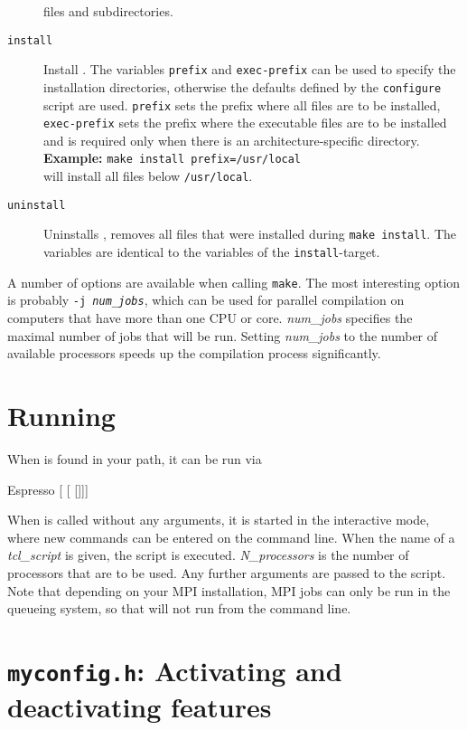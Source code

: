 \begin{description}
  files and subdirectories.
\item[\texttt{install}] Install \es. The variables \texttt{prefix} and
  \texttt{exec-prefix} can be used to specify the installation
  directories, otherwise the defaults defined by the
  \texttt{configure} script are used. \texttt{prefix} sets the prefix
  where all \es files are to be installed, \texttt{exec-prefix} sets
  the prefix where the executable files are to be installed and is
  required only when there is an architecture-specific directory.\\
  \textbf{Example:} \verb!make install prefix=/usr/local!\\
  will install all files below \texttt{/usr/local}.
\item[\texttt{uninstall}] Uninstalls \es, \ie removes all files that
  were installed during \texttt{make install}. The variables are
  identical to the variables of the \texttt{install}-target.
\end{description}

A number of options are available when calling \texttt{make}.  The
most interesting option is probably \texttt{-j \textit{num\_jobs}},
which can be used for parallel compilation on computers that have more
than one CPU or core.  \textit{num\_jobs} specifies the maximal number
of jobs that will be run.  Setting \textit{num\_jobs} to the number of
available processors speeds up the compilation process significantly.

\section{Running \es}
\label{sec:run}

When \es is found in your path, it can be run via
\begin{code}
Espresso [ [ []]]
\end{code}

 When \es{} is called without any arguments,
it is started in the interactive mode, where new commands can be
entered on the command line. When the name of a \textit{tcl\_script}
is given, the script is executed. \textit{N\_processors} is the number
of processors that are to be used. Any further arguments are passed to
the script. Note that depending on your MPI installation, MPI jobs can
only be run in the queueing system, so that \es will not run from
the command line.


\section{\texttt{myconfig.h}: Activating and deactivating features}
\label{sec:myconfig}

